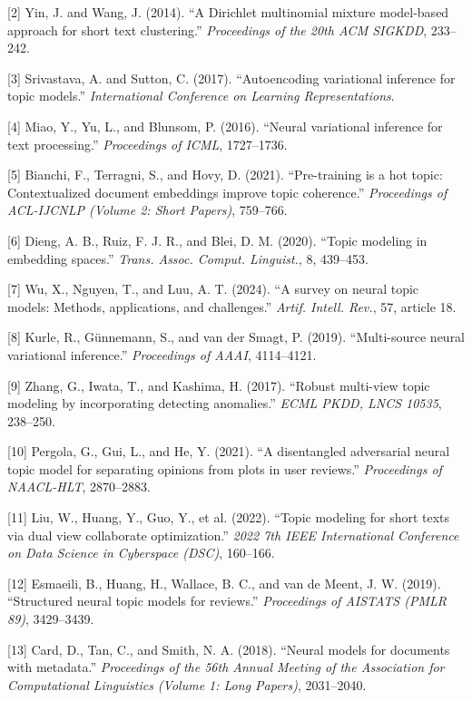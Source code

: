 \documentclass{article}
\begin{document}
[2] Yin, J. and Wang, J. (2014). ``A {Dirichlet} multinomial mixture model-based approach for short text clustering.'' \emph{Proceedings of the 20th ACM SIGKDD}, 233--242.

[3] Srivastava, A. and Sutton, C. (2017). ``Autoencoding variational inference for topic models.'' {\em International Conference on Learning Representations}.

[4] Miao, Y., Yu, L., and Blunsom, P. (2016). ``Neural variational inference for text processing.'' {\em Proceedings of ICML}, 1727--1736.

[5] Bianchi, F., Terragni, S., and Hovy, D. (2021). ``Pre-training is a hot topic: Contextualized document embeddings improve topic coherence.'' \emph{Proceedings of ACL-IJCNLP (Volume 2: Short Papers)}, 759--766.

[6] Dieng, A. B., Ruiz, F. J. R., and Blei, D. M. (2020). ``Topic modeling in embedding spaces.'' \emph{Trans. Assoc. Comput. Linguist.}, 8, 439--453.

[7] Wu, X., Nguyen, T., and Luu, A. T. (2024). ``A survey on neural topic models: Methods, applications, and challenges.'' \emph{Artif. Intell. Rev.}, 57, article 18.

[8] Kurle, R., G\"unnemann, S., and van der Smagt, P. (2019). ``Multi-source neural variational inference.'' \emph{Proceedings of AAAI}, 4114--4121.

[9] Zhang, G., Iwata, T., and Kashima, H. (2017). ``Robust multi-view topic modeling by incorporating detecting anomalies.'' \emph{ECML PKDD, LNCS 10535}, 238--250.

[10] Pergola, G., Gui, L., and He, Y. (2021). ``A disentangled adversarial neural topic model for separating opinions from plots in user reviews.'' \emph{Proceedings of NAACL-HLT}, 2870--2883.

[11] Liu, W., Huang, Y., Guo, Y., et al. (2022). ``Topic modeling for short texts via dual view collaborate optimization.'' \emph{2022 7th IEEE International Conference on Data Science in Cyberspace (DSC)}, 160--166.

[12] Esmaeili, B., Huang, H., Wallace, B. C., and van de Meent, J. W. (2019). ``Structured neural topic models for reviews.'' \emph{Proceedings of AISTATS (PMLR 89)}, 3429--3439.

[13] Card, D., Tan, C., and Smith, N. A. (2018). ``Neural models for documents with metadata.'' \emph{Proceedings of the 56th Annual Meeting of the Association for Computational Linguistics (Volume 1: Long Papers)}, 2031--2040.
\end{document}

